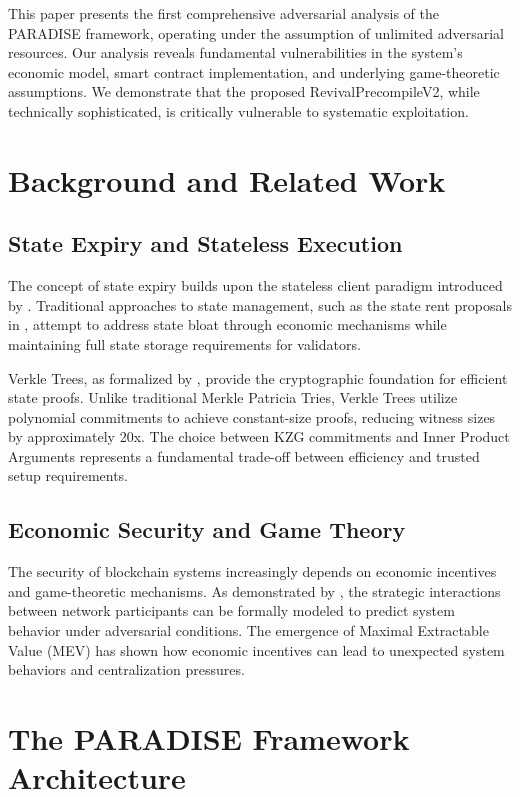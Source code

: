 \documentclass{article}
\begin{document}
This paper presents the first comprehensive adversarial analysis of the PARADISE framework, operating under the assumption of unlimited adversarial resources. Our analysis reveals fundamental vulnerabilities in the system's economic model, smart contract implementation, and underlying game-theoretic assumptions. We demonstrate that the proposed RevivalPrecompileV2, while technically sophisticated, is critically vulnerable to systematic exploitation.

\section{Background and Related Work}

\subsection{State Expiry and Stateless Execution}

The concept of state expiry builds upon the stateless client paradigm introduced by \cite{buterin2017}. Traditional approaches to state management, such as the state rent proposals in \cite{eip4762}, attempt to address state bloat through economic mechanisms while maintaining full state storage requirements for validators.

Verkle Trees, as formalized by \cite{kuszmaul2018}, provide the cryptographic foundation for efficient state proofs. Unlike traditional Merkle Patricia Tries, Verkle Trees utilize polynomial commitments to achieve constant-size proofs, reducing witness sizes by approximately 20x. The choice between KZG commitments \cite{kate2010} and Inner Product Arguments \cite{bunz2018} represents a fundamental trade-off between efficiency and trusted setup requirements.

\subsection{Economic Security and Game Theory}

The security of blockchain systems increasingly depends on economic incentives and game-theoretic mechanisms. As demonstrated by \cite{ali2024}, the strategic interactions between network participants can be formally modeled to predict system behavior under adversarial conditions. The emergence of Maximal Extractable Value (MEV) \cite{daian2019} has shown how economic incentives can lead to unexpected system behaviors and centralization pressures.

\section{The PARADISE Framework Architecture}
\end{document}
